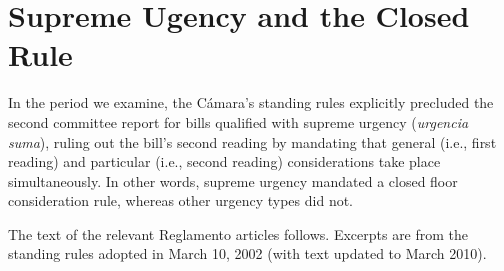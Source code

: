 \documentclass[letter,12pt]{article}
\begin{document}
\section{Supreme Ugency and the Closed Rule}

In the period we examine, the Cámara's standing rules explicitly precluded the second committee report for bills qualified with supreme urgency (\emph{urgencia suma}), ruling out the bill's second reading by mandating that general (i.e., first reading) and particular (i.e., second reading) considerations take place simultaneously. In other words, supreme urgency mandated a closed floor consideration rule, whereas other urgency types did not.

The text of the relevant Reglamento articles follows. Excerpts are from the standing rules adopted in March 10, 2002 (with text updated to March 2010).  

\end{document}
